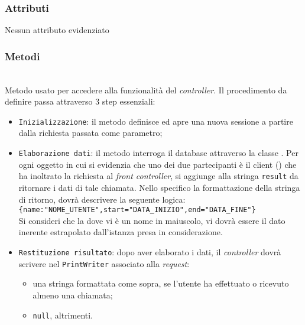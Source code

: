 \subsubsection*{Attributi}

Nessun attributo evidenziato

\subsubsection*{Metodi}
\begin{description}
	
	\item{}\\
	Metodo usato per accedere alla funzionalità del \textit{controller}. Il procedimento da definire passa attraverso 3 step essenziali:
	\begin{itemize}
		\item \texttt{Inizializzazione}: il metodo definisce ed apre una nuova sessione a partire dalla richiesta  passata come parametro;
		\item \texttt{Elaborazione dati}: il metodo interroga il database attraverso la classe . Per ogni oggetto  in cui si evidenzia che uno dei due partecipanti è il client () che ha inoltrato la richiesta al \textit{front controller}, si aggiunge alla stringa \texttt{result} da ritornare i dati di tale chiamata. Nello specifico la formattazione della stringa di ritorno, dovrà descrivere la seguente logica:\\
		
		\verb|{name:"NOME_UTENTE",start="DATA_INIZIO",end="DATA_FINE"}|\\
		
		Si consideri che la dove vi è un nome in maiuscolo, vi dovrà essere il dato inerente estrapolato dall'istanza  presa in considerazione.
		\item \texttt{Restituzione risultato}: dopo aver elaborato i dati, il \textit{controller} dovrà scrivere nel \texttt{PrintWriter} associato alla \textit{request}:
			\begin{itemize}
				\item una stringa formattata come sopra, se l'utente ha effettuato o ricevuto almeno una chiamata;
				\item \texttt{null}, altrimenti.
			\end{itemize}
	\end{itemize}

\end{description}

